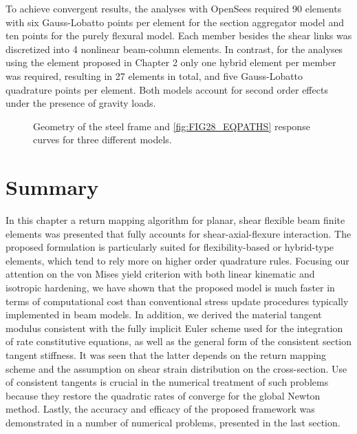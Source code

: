 To 
achieve convergent results, the analyses with OpenSees required 90 elements 
with six Gauss-Lobatto points per element for the section aggregator model and 
ten points for the purely flexural model. Each member besides the shear 
links was discretized into 4 nonlinear beam-column elements. In contrast, for 
the analyses using the element proposed in Chapter 2 only one hybrid element 
per 
member was required, resulting in 27 elements in total, and five Gauss-Lobatto 
quadrature points per 
element. Both models account for second order effects under the presence of 
gravity loads.

\begin{figure}
	\centering
	\caption{Geometry of the steel frame and \ref{fig:FIG28_EQPATHS} response 
		curves for three different models.}
	\label{fig:FIG28}
\end{figure}



\section{Summary}

In this chapter a return mapping algorithm for planar, shear 
flexible beam finite elements was presented that fully accounts for 
shear-axial-flexure 
interaction. The proposed formulation is particularly suited for 
flexibility-based or 
hybrid-type elements, which tend to rely more on higher order quadrature rules. 
Focusing our attention on the von Mises yield criterion with both linear 
kinematic and 
isotropic hardening, we have shown that the proposed model is much faster in 
terms of computational cost than 
conventional stress update procedures typically implemented in beam models. In 
addition, we derived the material tangent modulus consistent with the fully 
implicit Euler scheme used for the integration of rate constitutive equations, 
as well as the general form of the consistent section tangent stiffness. It was 
seen that 
the latter depends on the return mapping scheme and the assumption on shear 
strain 
distribution on the cross-section. Use of consistent tangents is crucial in the 
numerical treatment of such problems because they restore the quadratic rates 
of 
converge for the global Newton method. Lastly, the accuracy and efficacy of the 
proposed 
framework was demonstrated in a number of numerical problems, presented in the 
last section. 